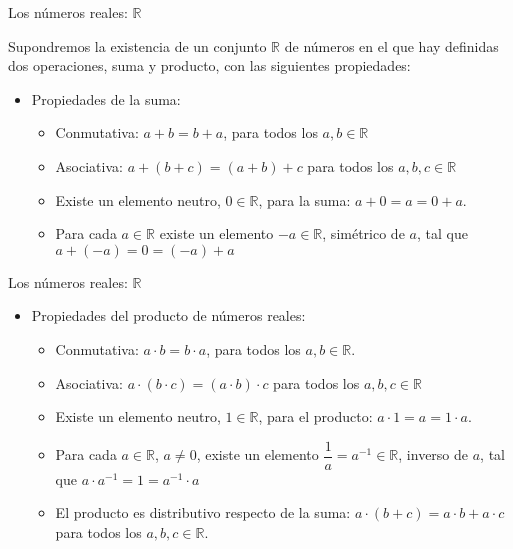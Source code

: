 \documentclass[
  ignorenonframetext,
]{beamer}
\providecommand{\tightlist}{%
  \setlength{\itemsep}{0pt}\setlength{\parskip}{0pt}}
\begin{document}
\begin{frame}{Los números reales: \(\mathbb{R}\)}
\protect\hypertarget{los-nuxfameros-reales-mathbbr}{}

Supondremos la existencia de un conjunto \(\mathbb{R}\) de números en el
que hay definidas dos operaciones, suma y producto, con las siguientes
propiedades:

\begin{itemize}
\tightlist
\item
  Propiedades de la suma:

  \begin{itemize}
  \item
    Conmutativa: \(a+b= b+a\), para todos los \(a,b \in \mathbb{R}\)
  \item
    Asociativa: \(a+(b+c) = (a+b)+c\) para todos los
    \(a,b,c \in \mathbb{R}\)
  \item
    Existe un elemento neutro, \(0 \in \mathbb{R}\), para la suma:
    \(a+0=a=0+a\).
  \item
    Para cada \(a \in \mathbb{R}\) existe un elemento
    \(-a \in \mathbb{R}\), simétrico de \(a\), tal que
    \(a+(-a)=0=(-a)+a\)
  \end{itemize}
\end{itemize}

\end{frame}

\begin{frame}{Los números reales: \(\mathbb{R}\)}
\protect\hypertarget{los-nuxfameros-reales-mathbbr-1}{}

\begin{itemize}
\item
  Propiedades del producto de números reales:

  \begin{itemize}
  \item
    Conmutativa: \(a\cdot b=b \cdot a\), para todos los
    \(a,b \in \mathbb{R}\).
  \item
    Asociativa: \(a \cdot (b \cdot c) = (a\cdot b)\cdot c\) para todos
    los \(a,b,c \in \mathbb{R}\)
  \item
    Existe un elemento neutro, \(1 \in \mathbb{R}\), para el producto:
    \(a\cdot1=a=1\cdot a\).
  \item
    Para cada \(a \in \mathbb{R}\), \(a\neq 0\), existe un elemento
    \(\dfrac{1}{a} = a^{-1} \in \mathbb{R}\), inverso de \(a\), tal que
    \(a \cdot a^{-1}=1=a ^{-1}\cdot a\)
  \item
    El producto es distributivo respecto de la suma:
    \(a\cdot (b+c) = a\cdot b + a \cdot c\) para todos los
    \(a,b,c \in \mathbb{R}\).
  \end{itemize}
\end{itemize}

\end{frame}
\end{document}
